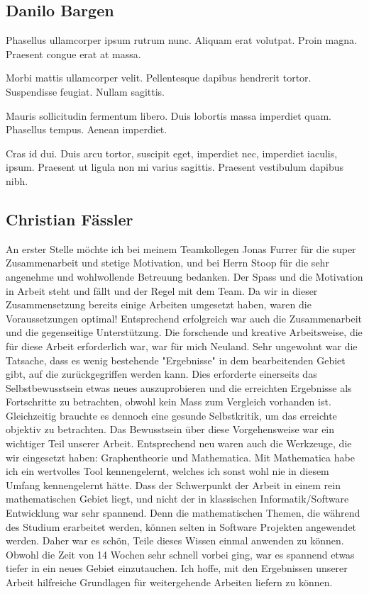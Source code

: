 \subsection{Danilo Bargen}
Phasellus ullamcorper ipsum rutrum nunc. Aliquam erat volutpat. Proin magna.
Praesent congue erat at massa.

Morbi mattis ullamcorper velit. Pellentesque dapibus hendrerit tortor.
Suspendisse feugiat. Nullam sagittis.

Mauris sollicitudin fermentum libero. Duis lobortis massa imperdiet quam.
Phasellus tempus. Aenean imperdiet.

Cras id dui. Duis arcu tortor, suscipit eget, imperdiet nec, imperdiet iaculis,
ipsum. Praesent ut ligula non mi varius sagittis. Praesent vestibulum dapibus
nibh.


\subsection{Christian Fässler} 
An erster Stelle möchte ich bei meinem Teamkollegen Jonas Furrer für die super
Zusammenarbeit und stetige Motivation, und bei Herrn Stoop für die sehr
angenehme und wohlwollende Betreuung bedanken. Der Spass und die Motivation in
Arbeit steht und fällt und der Regel mit dem Team. Da wir in dieser
Zusammensetzung bereits einige Arbeiten umgesetzt haben, waren die
Voraussetzungen optimal! Entsprechend erfolgreich war auch die Zusammenarbeit
und die gegenseitige Unterstützung. Die forschende und kreative Arbeitsweise,
die für diese Arbeit erforderlich war, war für mich Neuland. Sehr ungewohnt war
die Tatsache, dass es wenig bestehende "Ergebnisse" in dem bearbeitenden Gebiet
gibt, auf die zurückgegriffen werden kann.  Dies erforderte einerseits das
Selbstbewusstsein etwas neues auszuprobieren und die erreichten Ergebnisse als
Fortschritte zu betrachten, obwohl kein Mass zum Vergleich vorhanden ist.
Gleichzeitig  brauchte es dennoch eine gesunde Selbstkritik, um das erreichte
objektiv zu betrachten. Das Bewusstsein über diese Vorgehensweise war ein
wichtiger Teil unserer Arbeit. Entsprechend neu waren auch die Werkzeuge, die
wir eingesetzt haben: Graphentheorie und Mathematica. Mit Mathematica habe ich
ein wertvolles Tool kennengelernt, welches ich sonst wohl nie in diesem Umfang
kennengelernt hätte. Dass der Schwerpunkt der Arbeit in einem rein
mathematischen Gebiet liegt, und nicht der in klassischen Informatik/Software
Entwicklung war sehr spannend. Denn die mathematischen Themen, die während des
Studium erarbeitet werden, können selten in Software Projekten angewendet
werden. Daher war es schön, Teile dieses Wissen einmal anwenden zu können.
Obwohl die Zeit von 14 Wochen sehr schnell vorbei ging, war es spannend etwas
tiefer in ein neues Gebiet einzutauchen. Ich hoffe, mit den Ergebnissen unserer
Arbeit hilfreiche Grundlagen für weitergehende Arbeiten liefern zu können.


